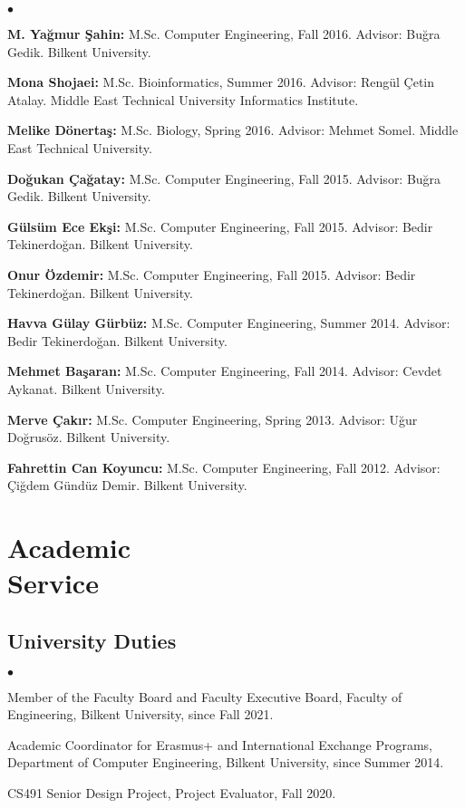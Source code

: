 \documentclass[margin,line]{res}
\newenvironment{list2}{
  \begin{list}{$\bullet$}{%
      \setlength{\itemsep}{0.1cm}
      \setlength{\parsep}{0in} \setlength{\parskip}{0in}
      \setlength{\topsep}{0in} \setlength{\partopsep}{0in} 
      \setlength{\leftmargin}{0.2in}}}{\end{list}}
\begin{document}
\begin{resume}
\begin{list2}
\clearpage

\item
  {\bf M. Yağmur Şahin:} M.Sc. Computer Engineering, Fall 2016. Advisor: Buğra Gedik.
  Bilkent University. 
\item
  {\bf Mona Shojaei:} M.Sc. Bioinformatics,  Summer 2016. Advisor: Rengül Çetin Atalay.
  Middle East Technical University Informatics Institute.

\item
  {\bf Melike Dönertaş:} M.Sc. Biology, Spring 2016. Advisor: Mehmet Somel.
  Middle East Technical University. 
\item
  {\bf Doğukan Çağatay:} M.Sc. Computer Engineering,  Fall 2015. Advisor: Buğra Gedik.
  Bilkent University. 
\item
  {\bf Gülsüm Ece Ekşi:} M.Sc. Computer Engineering,  Fall 2015. Advisor: Bedir Tekinerdoğan.
Bilkent University. 
\item
  {\bf Onur Özdemir:} M.Sc. Computer Engineering,  Fall 2015. Advisor: Bedir Tekinerdoğan.
  Bilkent University. 
\item
  {\bf Havva Gülay Gürbüz:} M.Sc. Computer Engineering, Summer 2014. Advisor: Bedir Tekinerdoğan.
  Bilkent University. 
 \item
  {\bf Mehmet Başaran:} M.Sc. Computer Engineering, Fall 2014. Advisor: Cevdet Aykanat.
  Bilkent University. 
\item
  {\bf Merve Çakır:} M.Sc. Computer Engineering, Spring 2013. Advisor: Uğur Doğrusöz.
  Bilkent University.
\item
  {\bf Fahrettin Can Koyuncu:} M.Sc. Computer Engineering, Fall 2012. Advisor: Çiğdem Gündüz Demir.
  Bilkent University. 
  \end{list2}


\vspace*{-.2cm}
\section{\sc Academic \\ Service}
\vspace{-0.3cm}
\subsection{\small \sc University Duties}
\begin{list2}
\item 
 Member of the Faculty Board and Faculty Executive Board, Faculty of Engineering, Bilkent University, since Fall 2021.
\item
  Academic Coordinator for Erasmus+ and International Exchange Programs, Department of Computer Engineering, Bilkent University, since Summer 2014.
  \item CS491 Senior Design Project, Project Evaluator, Fall 2020.
\end{list2}
\vspace{-0.4cm}



\end{resume}
\end{document}
